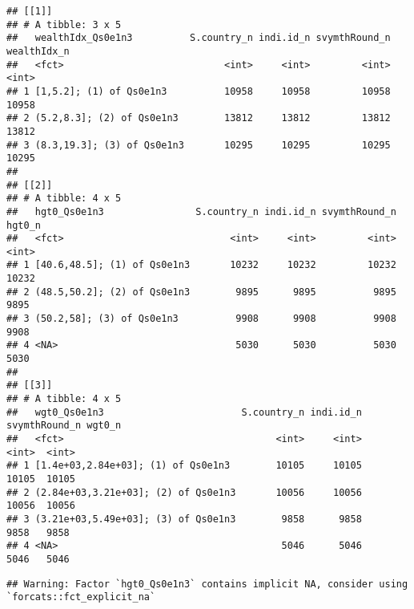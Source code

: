 \documentclass[
]{book}
\newenvironment{Shaded}{\begin{snugshade}}{\end{snugshade}}
\newcommand{\CommentTok}[1]{\textcolor[rgb]{0.56,0.35,0.01}{\textit{#1}}}
\newcommand{\DataTypeTok}[1]{\textcolor[rgb]{0.13,0.29,0.53}{#1}}
\newcommand{\KeywordTok}[1]{\textcolor[rgb]{0.13,0.29,0.53}{\textbf{#1}}}
\newcommand{\NormalTok}[1]{#1}
\newcommand{\OperatorTok}[1]{\textcolor[rgb]{0.81,0.36,0.00}{\textbf{#1}}}
\newcommand{\StringTok}[1]{\textcolor[rgb]{0.31,0.60,0.02}{#1}}
\begin{document}
\begin{verbatim}
## [[1]]
## # A tibble: 3 x 5
##   wealthIdx_Qs0e1n3          S.country_n indi.id_n svymthRound_n wealthIdx_n
##   <fct>                            <int>     <int>         <int>       <int>
## 1 [1,5.2]; (1) of Qs0e1n3          10958     10958         10958       10958
## 2 (5.2,8.3]; (2) of Qs0e1n3        13812     13812         13812       13812
## 3 (8.3,19.3]; (3) of Qs0e1n3       10295     10295         10295       10295
## 
## [[2]]
## # A tibble: 4 x 5
##   hgt0_Qs0e1n3                S.country_n indi.id_n svymthRound_n hgt0_n
##   <fct>                             <int>     <int>         <int>  <int>
## 1 [40.6,48.5]; (1) of Qs0e1n3       10232     10232         10232  10232
## 2 (48.5,50.2]; (2) of Qs0e1n3        9895      9895          9895   9895
## 3 (50.2,58]; (3) of Qs0e1n3          9908      9908          9908   9908
## 4 <NA>                               5030      5030          5030   5030
## 
## [[3]]
## # A tibble: 4 x 5
##   wgt0_Qs0e1n3                        S.country_n indi.id_n svymthRound_n wgt0_n
##   <fct>                                     <int>     <int>         <int>  <int>
## 1 [1.4e+03,2.84e+03]; (1) of Qs0e1n3        10105     10105         10105  10105
## 2 (2.84e+03,3.21e+03]; (2) of Qs0e1n3       10056     10056         10056  10056
## 3 (3.21e+03,5.49e+03]; (3) of Qs0e1n3        9858      9858          9858   9858
## 4 <NA>                                       5046      5046          5046   5046
\end{verbatim}

\begin{Shaded}
\end{Shaded}

\begin{verbatim}
## Warning: Factor `hgt0_Qs0e1n3` contains implicit NA, consider using `forcats::fct_explicit_na`
\end{verbatim}
\end{document}
